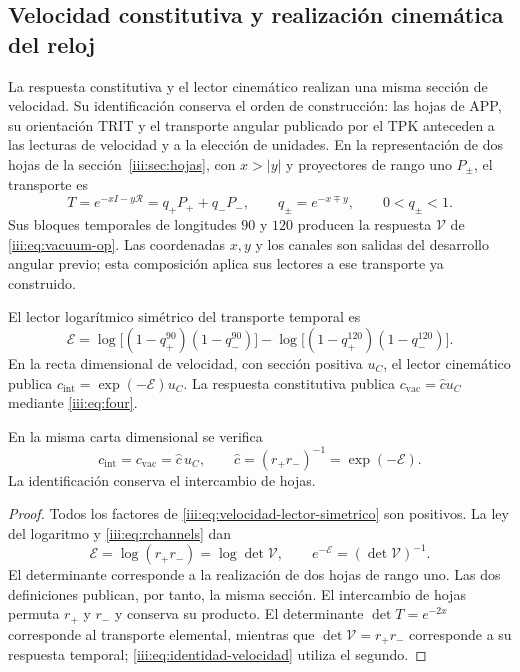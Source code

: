 \subsection{Velocidad constitutiva y realización cinemática del reloj}
\label{iii:sec:enlace-velocidad-constitutiva}

La respuesta constitutiva y el lector cinemático realizan una misma
sección de velocidad. Su identificación conserva el orden de construcción:
las hojas de APP, su orientación TRIT y el transporte angular publicado
por el TPK anteceden a las lecturas de velocidad y a la elección de unidades.
En la representación de dos hojas de la
sección~\ref{iii:sec:hojas}, con $x>|y|$ y proyectores de rango uno
$P_\pm$, el transporte es
\[
 T=e^{-xI-y\mathcal R}=q_+P_++q_-P_-,
 \qquad q_\pm=e^{-x\mp y},\qquad 0<q_\pm<1.
\]
Sus bloques temporales de longitudes $90$ y $120$ producen la respuesta
$\mathcal V$ de \eqref{iii:eq:vacuum-op}. Las coordenadas $x,y$ y los
canales son salidas del desarrollo angular previo; esta composición
aplica sus lectores a ese transporte ya construido.

El lector logarítmico simétrico del transporte temporal es
\begin{equation}
 \mathcal E=
 \log\!\bigl[(1-q_+^{90})(1-q_-^{90})\bigr]
 -\log\!\bigl[(1-q_+^{120})(1-q_-^{120})\bigr].
 \label{iii:eq:velocidad-lector-simetrico}
\end{equation}
En la recta dimensional de velocidad, con sección positiva $u_C$, el
lector cinemático publica $c_{\mathrm{int}}=\exp(-\mathcal E)u_C$.
La respuesta constitutiva publica
$c_{\mathrm{vac}}=\widehat c u_C$ mediante \eqref{iii:eq:four}.

\begin{proposition}
\label{iii:prop:identidad-velocidad}
En la misma carta dimensional se verifica
\begin{equation}
 c_{\mathrm{int}}=c_{\mathrm{vac}}=\widehat c\,u_C,
 \qquad \widehat c=(r_+r_-)^{-1}=\exp(-\mathcal E).
 \label{iii:eq:identidad-velocidad}
\end{equation}
La identificación conserva el intercambio de hojas.
\end{proposition}
\begin{proof}
Todos los factores de \eqref{iii:eq:velocidad-lector-simetrico} son
positivos. La ley del logaritmo y \eqref{iii:eq:rchannels} dan
\[
 \mathcal E=\log(r_+r_-)=\log\det\mathcal V,
 \qquad e^{-\mathcal E}=(\det\mathcal V)^{-1}.
\]
El determinante corresponde a la realización de dos hojas de rango uno.
Las dos definiciones publican, por tanto, la misma sección. El intercambio
de hojas permuta $r_+$ y $r_-$ y conserva su producto. El determinante
$\det T=e^{-2x}$ corresponde al transporte elemental, mientras que
$\det\mathcal V=r_+r_-$ corresponde a su respuesta temporal;
\eqref{iii:eq:identidad-velocidad} utiliza el segundo.
\end{proof}

